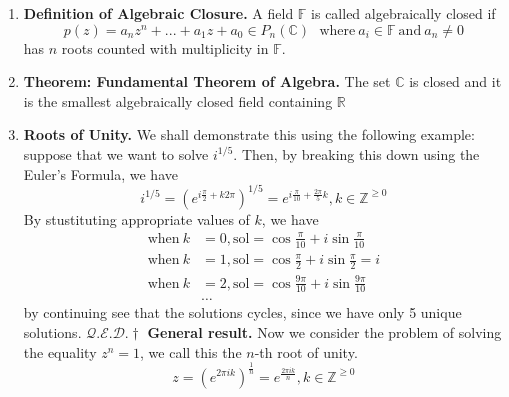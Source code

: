 \documentclass[oneside, 12pt]{book}
\newcommand{\settag}[1]{\renewcommand{\theenumi}{#1}}
\newcommand{\real}{\mathbb{R}}
\newcommand{\complex}{\mathbb{C}}
\newcommand{\qed}{\hfill $\mathcal{Q}.\mathcal{E}.\mathcal{D}.\dagger$}
\newcommand{\tbf}[1]{\textbf{#1}}
\newcommand{\para}[1]{\item \tbf{#1}}
\begin{document}
\begin{enumerate}
    \settag{5.1.11}
    \para{Definition of Algebraic Closure.} A field $\mathbb{F}$ is called algebraically closed if
    \begin{equation*}
        p(z) = a_nz^n + ... + a_1z + a_0\in P_n(\complex)~~~\text{where}~a_i\in \mathbb{F}~\text{and}~a_n\neq 0
    \end{equation*}
    has $n$ roots counted with multiplicity in $\mathbb{F}$.

    \settag{5.1.12}
    \para{Theorem: Fundamental Theorem of Algebra.} The set $\complex$ is closed and it is the smallest algebraically closed field 
    containing $\real$

    \settag{5.1.*}
    \para{Roots of Unity.} We shall demonstrate this using the following example: suppose that we want to solve $i^{1/5}$.
    Then, by breaking this down using the Euler's Formula, we have
    \begin{equation*}
        i^{1/5} = \left(e^{i\frac{\pi}{2} + k2\pi}\right)^{1/5} = e^{i\frac{\pi}{10} + \frac{2\pi}{5}k}, 
        k \in \mathbb{Z}^{\geq 0}
    \end{equation*}
    By stustituting appropriate values of $k$, we have
    \begin{align*}
        \text{when}~k&=0, \text{sol} = \cos \frac{\pi}{10} + i\sin \frac{\pi}{10} \\
        \text{when}~k&=1, \text{sol} = \cos \frac{\pi}{2} + i\sin \frac{\pi}{2}  = i\\
        \text{when}~k&=2, \text{sol} = \cos \frac{9\pi}{10} + i\sin \frac{9\pi}{10} \\
        &\ldots
    \end{align*}
    by continuing see that the solutions cycles, since we have only 5 unique solutions. \qed\newline
    \textbf{General result.} Now we consider the problem of solving the equality $z^n = 1$, we call this the
    $n$-th root of unity.
    \begin{equation*}
        z = \left(e^{2\pi ik}\right)^\frac{1}{n} = e^{\frac{2\pi ik}{n}}, k\in \mathbb{Z}^{\geq 0}
    \end{equation*}
\end{enumerate}
\end{document}
